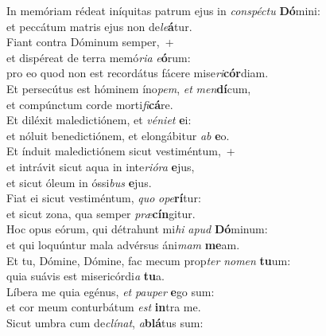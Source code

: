 \oddverse In memóriam rédeat iníquitas patrum ejus in \textit{con}\textit{spé}\textit{ctu} \textbf{Dó}mini:~\*\\
\oddverse et peccátum matris ejus non de\textit{le}\textbf{á}tur.\\
\evenverse Fiant contra Dóminum semper,~+\\
\evenverse  et dispéreat de terra memó\textit{ri}\textit{a} \textit{e}\textbf{ó}rum:~\*\\
\evenverse pro eo quod non est recordátus fácere mise\textit{ri}\textbf{cór}diam.\\
\oddverse Et persecútus est hóminem íno\textit{pem}, \textit{et} \textit{men}\textbf{dí}cum,~\*\\
\oddverse et compúnctum corde morti\textit{fi}\textbf{cá}re.\\
\evenverse Et diléxit maledictiónem, et \textit{vé}\textit{ni}\textit{et} \textbf{e}i:~\*\\
\evenverse et nóluit benedictiónem, et elongábitur \textit{ab} \textbf{e}o.\\
\oddverse Et índuit maledictiónem sicut vestiméntum,~+\\
\oddverse  et intrávit sicut aqua in inte\textit{ri}\textit{ó}\textit{ra} \textbf{e}jus,~\*\\
\oddverse et sicut óleum in óssi\textit{bus} \textbf{e}jus.\\
\evenverse Fiat ei sicut vestiméntum, \textit{quo} \textit{o}\textit{pe}\textbf{rí}tur:~\*\\
\evenverse et sicut zona, qua semper \textit{præ}\textbf{cín}gitur.\\
\oddverse Hoc opus eórum, qui détrahunt mi\textit{hi} \textit{a}\textit{pud} \textbf{Dó}minum:~\*\\
\oddverse et qui loquúntur mala advérsus áni\textit{mam} \textbf{me}am.\\
\evenverse Et tu, Dómine, Dómine, fac mecum prop\textit{ter} \textit{no}\textit{men} \textbf{tu}um:~\*\\
\evenverse quia suávis est misericórdi\textit{a} \textbf{tu}a.\\
\oddverse Líbera me quia egénus, \textit{et} \textit{pau}\textit{per} \textbf{e}go sum:~\*\\
\oddverse et cor meum conturbátum \textit{est} \textbf{in}tra me.\\
\evenverse Sicut umbra cum de\textit{clí}\textit{nat}, \textit{a}\textbf{blá}tus sum:~\*\\
